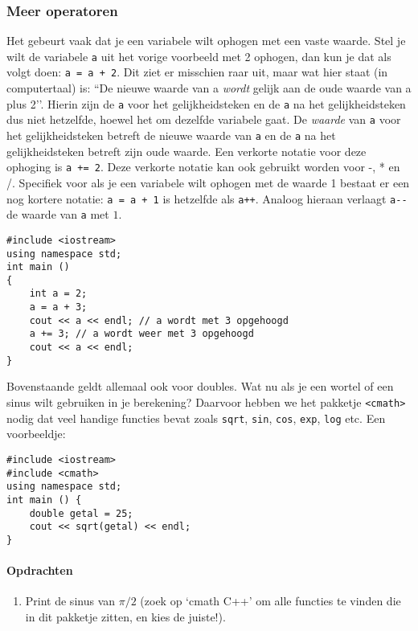 \documentclass[12pt,a4paper]{article}
\newcommand{\icode}{\lstinline}
\begin{document}
\subsubsection{Meer operatoren}
Het gebeurt vaak dat je een variabele wilt ophogen met een vaste waarde. Stel je wilt de 
variabele \icode{a} uit het vorige voorbeeld met 2 ophogen, dan kun je dat als volgt doen: \icode{a = a + 2}. Dit ziet er misschien raar uit, maar wat hier staat (in computertaal) is: ``De nieuwe waarde 
van a \emph{wordt} gelijk aan de oude waarde van a plus 2’’. Hierin zijn de \icode{a} voor het 
gelijkheidsteken en de \icode{a} na het gelijkheidsteken dus niet hetzelfde, hoewel het om dezelfde 
variabele gaat. De \emph{waarde} van \icode{a} voor het gelijkheidsteken betreft de nieuwe waarde 
van \icode{a} en de \icode{a} na het gelijkheidsteken betreft zijn oude waarde. Een verkorte notatie
voor deze ophoging is \icode{a += 2}.
Deze verkorte notatie kan ook gebruikt worden voor -, * en /.
Specifiek voor als je een variabele wilt ophogen met de waarde 
1 bestaat er een nog kortere notatie: \icode{a = a + 1} is hetzelfde als \icode{a++}. 
Analoog hieraan verlaagt \icode{a--} de waarde van \icode{a} met $1$.
\begin{lstlisting}
#include <iostream> 
using namespace std; 
int main () 
{
	int a = 2; 
	a = a + 3;
	cout << a << endl; // a wordt met 3 opgehoogd
	a += 3; // a wordt weer met 3 opgehoogd 
	cout << a << endl; 
}
\end{lstlisting}
Bovenstaande geldt allemaal ook voor doubles. Wat nu als je een wortel of een sinus wilt gebruiken 
in je berekening? Daarvoor hebben we het pakketje \icode{<cmath>} nodig dat veel handige functies 
bevat zoals \icode{sqrt}, \icode{sin}, \icode{cos}, \icode{exp}, \icode{log} etc. Een voorbeeldje: 
\begin{lstlisting}
#include <iostream> 
#include <cmath>
using namespace std; 
int main () {
	double getal = 25; 
	cout << sqrt(getal) << endl; 
}
\end{lstlisting}
\paragraph{Opdrachten}
\begin{enumerate} 
\item 
Print de sinus van $\pi/2$ (zoek op `cmath C++’ om alle functies te vinden die in dit 
pakketje zitten, en kies de juiste!). 
\end{enumerate} 
\end{document}
